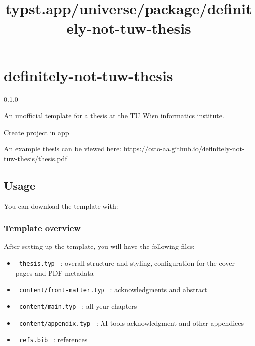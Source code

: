 \title{typst.app/universe/package/definitely-not-tuw-thesis}

\label{banner}
\label{template-thumbnail}

\section{definitely-not-tuw-thesis}\label{definitely-not-tuw-thesis}

{ 0.1.0 }

An unofficial template for a thesis at the TU Wien informatics
institute.

\href{/app?template=definitely-not-tuw-thesis&version=0.1.0}{Create
project in app}

\label{readme}
An example thesis can be viewed here:
\url{https://otto-aa.github.io/definitely-not-tuw-thesis/thesis.pdf}

\subsection{Usage}\label{usage}

You can download the template with:

\begin{Shaded}
\begin{Highlighting}[]
\end{Highlighting}
\end{Shaded}

\subsubsection{Template overview}\label{template-overview}

After setting up the template, you will have the following files:

\begin{itemize}
\tightlist
\item
  \texttt{\ thesis.typ\ } : overall structure and styling, configuration
  for the cover pages and PDF metadata
\item
  \texttt{\ content/front-matter.typ\ } : acknowledgments and abstract
\item
  \texttt{\ content/main.typ\ } : all your chapters
\item
  \texttt{\ content/appendix.typ\ } : AI tools acknowledgment and other
  appendices
\item
  \texttt{\ refs.bib\ } : references
\end{itemize}

